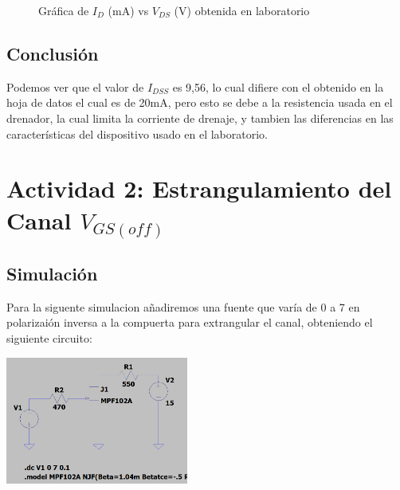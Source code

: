 \vspace{0.1cm}

\begin{figure}[ht]
    \centering
    \caption{Gráfica de $I_D$ (mA) vs $V_{DS}$ (V) obtenida en laboratorio}
\end{figure}


\subsection{Conclusión}

Podemos ver que el valor de $I_{DSS}$ es 9,56, lo cual difiere con el obtenido en la hoja de datos el cual es de 20mA, pero esto se debe a la resistencia usada en el drenador, la cual limita la corriente de drenaje, y tambien las diferencias en las características del dispositivo usado en el laboratorio.\\

\section{Actividad 2: Estrangulamiento del Canal $V_{GS(off)}$}

\subsection{Simulación}

Para la siguente simulacion añadiremos una fuente que varía de 0 a 7 en polarizaión inversa a la compuerta para extrangular el canal, obteniendo el siguiente circuito:

\includegraphics[width=6cm]{./imagenes/Circ2.png}


